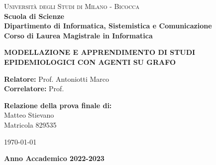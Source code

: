 \begin{titlepage}

    \noindent
    \begin{minipage}[t]{0.19\textwidth}
    \end{minipage}
    \begin{minipage}[t]{0.81\textwidth}
    {
            {\textsc{Università degli Studi di Milano - Bicocca}} \\
            \textbf{Scuola di Scienze} \\
            \textbf{Dipartimento di Informatica, Sistemistica e Comunicazione} \\
            \textbf{Corso di Laurea Magistrale in Informatica} \\
            \par
    }
    \end{minipage}

\vspace{20mm}

\begin{center}
        {\LARGE{
                \textbf{MODELLAZIONE E APPRENDIMENTO DI STUDI EPIDEMIOLOGICI CON AGENTI SU GRAFO}
                \par
        }}
    \end{center}

    \vspace{50mm}

    \noindent
    {\large \textbf{Relatore:} Prof. Antoniotti Marco} \\

    \noindent
    {\large \textbf{Correlatore:} Prof. }

    \vspace{10mm}

    \begin{flushright}
        {\large \textbf{Relazione della prova finale di:}} \\
        \large{Matteo Stievano} \\
        \large{Matricola 829535}
    \end{flushright}

    \vspace{10mm}
    \today
    \begin{center}
        {\large{\bf Anno Accademico 2022-2023}}
    \end{center}

    \restoregeometry

\end{titlepage}